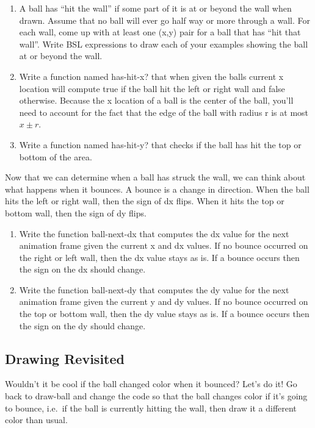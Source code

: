 \documentclass[nobib]{tufte-handout}
\begin{document}
\begin{enumerate}[resume]
  \item A ball has ``hit the wall'' if some part of it is at or beyond the wall when drawn. Assume that no ball will ever go half way or more through a wall. For each wall, come up with at least one (x,y) pair for a ball that has ``hit that wall''.  Write BSL expressions to draw each of your examples showing the ball at or beyond the wall.

  \item Write a function named has-hit-x? that when given the balls current x location will compute true if the ball hit the left or right wall and false otherwise. Because the x location of a ball is the center of the ball, you'll need to account for the fact that the edge of the ball with radius r is at most $x \pm r$.

  \item Write a function named has-hit-y? that checks if the ball has hit the top or bottom of the area.
\end{enumerate}

Now that we can determine when a ball has struck the wall, we can think about what happens when it bounces. A bounce is a change in direction. When the ball hits the left or right wall, then the sign of dx flips. When it hits the top or bottom wall, then the sign of dy flips.

\begin{enumerate}[resume]
  \item Write the function ball-next-dx that computes the dx value for the next animation frame given the current x and dx values. If no bounce occurred on the right or left wall, then the dx value stays as is. If a bounce occurs then the sign on the dx should change.

  \item Write the function ball-next-dy that computes the dy value for the next animation frame given the current y and dy values.  If no bounce occurred on the top or bottom wall, then the dy value stays as is. If a bounce occurs then the sign on the dy should change.
\end{enumerate}

\subsection*{Drawing Revisited}

Wouldn't it be cool if the ball changed color when it bounced? Let's do it! Go back to draw-ball and change the code so that the ball changes color if it's going to bounce, i.e.\ if the ball is currently hitting the wall, then draw it a different color than usual.
\end{document}
